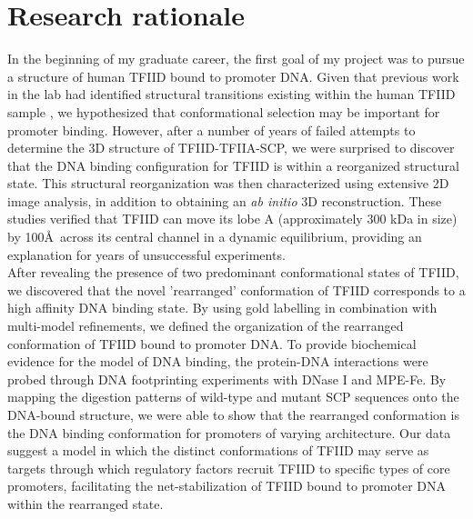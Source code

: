 \section{Research rationale}

In the beginning of my graduate career, the first goal of my project was to pursue a structure of human TFIID bound to promoter DNA. Given that previous work in the lab had identified structural transitions existing within the human TFIID sample \cite{Grob_1281}, we hypothesized that conformational selection may be important for promoter binding. However, after a number of years of failed attempts to determine the 3D structure of TFIID-TFIIA-SCP, we were surprised to discover that the DNA binding configuration for TFIID is within a reorganized structural state. This structural reorganization was then characterized using extensive 2D image analysis, in addition to obtaining an \emph{ab initio} 3D reconstruction. These studies verified that TFIID can move its lobe A (approximately 300 kDa in size) by 100\AA\ across its central channel in a dynamic equilibrium, providing an explanation for years of unsuccessful experiments. \\
\indent After revealing the presence of two predominant conformational states of TFIID, we discovered that the novel 'rearranged' conformation of TFIID corresponds to a high affinity DNA binding state. By using gold labelling in combination with multi-model refinements, we defined the organization of the rearranged conformation of TFIID bound to promoter DNA. To provide biochemical evidence for the model of DNA binding, the protein-DNA interactions were probed through DNA footprinting experiments with DNase I and MPE-Fe. By mapping the digestion patterns of wild-type and mutant SCP sequences onto the DNA-bound structure, we were able to show that the rearranged conformation is the DNA binding conformation for promoters of varying architecture. Our data suggest a model in which the distinct conformations of TFIID may serve as targets through which regulatory factors recruit TFIID to specific types of core promoters, facilitating the net-stabilization of TFIID bound to promoter DNA within the rearranged state.\\

